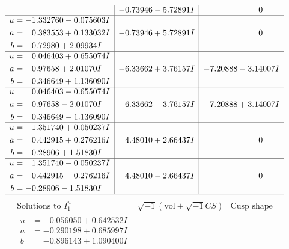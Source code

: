 \documentclass[1p]{elsarticle_modified}
\theoremstyle{definition}
\newcommand{\I}{\sqrt{-1}}
\begin{document}
$$\begin{array}{c|c|c}
 & -0.73946 - 5.72891 I & \phantom{-0.000000 } 0 \\ \hline\begin{aligned}
u &= -1.332760 - 0.075603 I \\
a &= \phantom{-}0.383553 + 0.133032 I \\
b &= -0.72980 + 2.09934 I\end{aligned}
 & -0.73946 + 5.72891 I & \phantom{-0.000000 } 0 \\ \hline\begin{aligned}
u &= \phantom{-}0.046403 + 0.655074 I \\
a &= \phantom{-}0.97658 + 2.01070 I \\
b &= \phantom{-}0.346649 + 1.136090 I\end{aligned}
 & -6.33662 + 3.76157 I & -7.20888 - 3.14007 I \\ \hline\begin{aligned}
u &= \phantom{-}0.046403 - 0.655074 I \\
a &= \phantom{-}0.97658 - 2.01070 I \\
b &= \phantom{-}0.346649 - 1.136090 I\end{aligned}
 & -6.33662 - 3.76157 I & -7.20888 + 3.14007 I \\ \hline\begin{aligned}
u &= \phantom{-}1.351740 + 0.050237 I \\
a &= \phantom{-}0.442915 + 0.276216 I \\
b &= -0.28906 + 1.51830 I\end{aligned}
 & \phantom{-}4.48010 + 2.66437 I & \phantom{-0.000000 } 0 \\ \hline\begin{aligned}
u &= \phantom{-}1.351740 - 0.050237 I \\
a &= \phantom{-}0.442915 - 0.276216 I \\
b &= -0.28906 - 1.51830 I\end{aligned}
 & \phantom{-}4.48010 - 2.66437 I & \phantom{-0.000000 } 0\\
 \hline 
 \end{array}$$\newpage$$\begin{array}{c|c|c}  
\text{Solutions to }I^u_{1}& \I (\text{vol} + \sqrt{-1}CS) & \text{Cusp shape}\\
 \hline 
\begin{aligned}
u &= -0.056050 + 0.642532 I \\
a &= -0.290198 + 0.685997 I \\
b &= -0.896143 + 1.090400 I\end{aligned}

\end{array}$$
\end{document}
